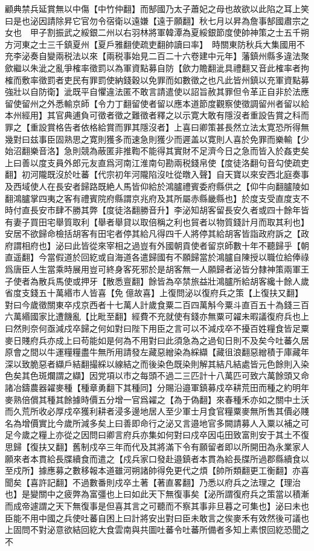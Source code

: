 顧典禁兵延賞無以中傷【中竹仲翻】而郜國乃太子蕭妃之母也故欲以此陷之耳上笑曰是也泌因請除昇它官勿令宿衛以遠嫌【遠于願翻】秋七月以昇為詹事郜國肅宗之女也　甲子割振武之綏銀二州以右羽林將軍韓潭為夏綏銀節度使帥神策之士五千朔方河東之士三千鎮夏州【夏戶雅翻使疏吏翻帥讀曰率】　時關東防秋兵大集國用不充李泌奏自變兩税法以來【兩税事始見二百二十六卷建中元年】藩鎮州縣多違法聚歛繼以朱泚之亂爭榷率徵罰以為軍資點募自防【歛力贍翻泚具禮翻又音此榷率者拘榷而敷率徵罰者吏民有罪罰使納錢穀以免罪而如數徵之也凡此皆州鎮以充軍資點募強壯以自防衛】泚既平自懼違法匿不敢言請遣使以詔旨赦其罪但令革正自非於法應留使留州之外悉輸京師【令力丁翻留使者留以應本道節度觀察使徵調留州者留以給本州經用】其官典逋負可徵者徵之難徵者釋之以示寛大敢有隱沒者重設告賞之科而罪之【重設賞格告者依格給賞而罪其隱沒者】上喜曰卿策甚長然立法太寛恐所得無幾對曰兹事臣固熟思之寛則獲多而速急則獲少而遲盖以寛則人喜於免罪而樂輸【少始沼翻樂音洛】急則競為蔽匿非推鞫不能得其實財不足濟今日之急而皆入於姦吏矣上曰善以度支員外郎元友直爲河南江淮南句勘兩税錢帛使【度徒洛翻句音勾使疏吏翻】初河隴既沒於吐蕃【代宗初年河隴陷沒吐從暾入聲】自天寶以來安西北庭奏事及西域使人在長安者歸路既絶人馬皆仰給於鴻臚禮賓委府縣供之【仰牛向翻臚陵如翻鴻臚掌四夷之客有禮賓院府縣謂京兆府及其所屬赤縣畿縣也】於度支受直度支不時付直長安市肆不勝其弊【度徒洛翻勝音升】李泌知胡客留長安久者或四十餘年皆有妻子買田宅舉質取利【舉者舉貸以取倍稱之利也貿者以物質錢計月而取其利也】安居不欲歸命檢括胡客有田宅者停其給凡得四千人將停其給胡客皆詣政府訴之【政府謂相府也】泌曰此皆從來宰相之過豈有外國朝貢使者留京師數十年不聽歸乎【朝直遥翻】今當假道於回紇或自海道各遣歸國有不願歸當於鴻臚自陳授以職位給俸祿爲唐臣人生當乘時展用豈可終身客死邪於是胡客無一人願歸者泌皆分隸神策兩軍王子使者為散兵馬使或押牙【散悉亶翻】餘皆為卒禁旅益壯鴻臚所給胡客纔十餘人歲省度支錢五十萬緡市人皆喜【免億故喜】上復問泌以復府兵之策【上復扶又翻】對曰今歲徵關東卒戍京西者十七萬人計歲食粟二百四萬斛今粟斗直百五十為錢三百六萬緡國家比遭饑亂【比毗至翻】經費不充就使有錢亦無粟可糴未暇議復府兵也上曰然則奈何亟減戍卒歸之何如對曰陛下用臣之言可以不減戍卒不擾百姓糧食皆足粟麥日賤府兵亦成上曰苟能如是何為不用對曰此須急為之過旬日則不及矣今吐蕃久居原會之間以牛運糧糧盡牛無所用請發左藏惡繒染為綵纈【藏徂浪翻惡繒積于庫藏年深以致脆惡者纈戶結翻撮綵以線結之而後染色既染則解其結凡結處皆元色餘則入染色矣其色斑爛謂之纈】因党項以市之每頭不過二三匹計十八萬匹可致六萬餘頭又命諸冶鑄農器糴麥種【種章勇翻下其種同】分賜沿邉軍鎮募戍卒耕荒田而種之約明年麥熟倍償其種其餘據時價五分增一官爲糴之【為于偽翻】來春種禾亦如之關中土沃而久荒所收必厚戍卒獲利耕者浸多邊地居人至少軍士月食官糧粟麥無所售其價必賤名為增價實比今歲所減多矣上曰善即命行之泌又言邉地官多闕請募人入粟以補之可足今歲之糧上亦從之因問曰卿言府兵亦集如何對曰戍卒因屯田致富則安于其土不復思歸【復扶又翻】舊制戍卒三年而代及其將滿下令有願留者即以所開田為永業家人願來者本貫給長牒續食而遣之【戍兵家口發赴邉鎮者本貫為給長牒所過郡縣續食以至戍所】據應募之數移報本道雖河朔諸帥得免更代之煩【帥所類翻更工衡翻】亦喜聞矣【喜許記翻】不過數番則戍卒土著【著直畧翻】乃悉以府兵之法理之【理治也】是變關中之疲弊為富彊也上曰如此天下無復事矣【泌所謂復府兵之策當以積漸而成帝遽謂之天下無復事是但喜其言之可聽而不察其事非旦暮之可集也】泌曰未也臣能不用中國之兵使吐蕃自困上曰計將安出對曰臣未敢言之俟麥禾有效然後可議也上固問不對泌意欲結回紇大食雲南與共圖吐蕃令吐蕃所備者多知上素恨回紇恐聞之不